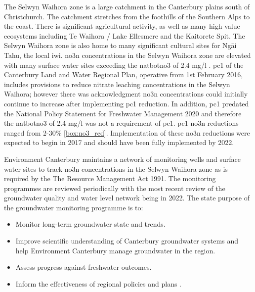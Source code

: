 The Selwyn Waihora zone is a large catchment in the Canterbury plains south of Christchurch.
The catchment stretches from the foothills of the Southern Alps to the coast.
There is significant agricultural activity, as well as many high value ecosystems including Te Waihora / Lake Ellesmere and the Kaitorete Spit.
The Selwyn Waihora zone is also home to many significant cultural sites for Ngāi Tahu, the local iwi.
\gls{no3n} concentrations in the Selwyn Waihora zone are elevated with many surface water sites exceeding the \gls{natbotno3} of 2.4 mg/l \citep{noauthor_national_2020}.
\gls{pc1} of the Canterbury Land and Water Regional Plan, operative from 1st February 2016, includes provisions to reduce nitrate leaching concentrations in the Selwyn Waihora; however there was acknowledgment \gls{no3n} concentrations could initially continue to increase after implementing \gls{pc1} reduction.
In addition, \gls{pc1} predated the National Policy Statement for Freshwater Management 2020 and therefore the \gls{natbotno3} of 2.4 mg/l was not a requirement of \gls{pc1}.
\gls{pc1} \gls{no3n} reductions ranged from 2-30\% \autoref{box:no3_red}.
Implementation of these \gls{no3n} reductions were expected to begin in 2017 and should have been fully implemented by 2022.


Environment Canterbury maintains a network of monitoring wells and surface water sites to track \gls{no3n} concentrations in the Selwyn Waihora zone as is required by the The Resource Management Act 1991.
The monitoring programmes are reviewed periodically with the most recent review of the groundwater quality and water level network being in 2022.
The state purpose of the groundwater monitoring programme is to:
\begin{itemize}
    \item Monitor long-term groundwater state and trends.
    \item Improve scientific understanding of Canterbury groundwater systems and help Environment Canterbury manage groundwater in the region.
    \item Assess progress against freshwater outcomes.
    \item Inform the effectiveness of regional policies and plans \citep{ecan_monitor_review}.
\end{itemize}

